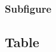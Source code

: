 \documentclass[12pt,a4paper,twoside]{report}
\begin{document}
            \subsubsection{Subfigure}
                \label{sec:subfig}    
                
                
       \clearpage
            
        \subsection{Table}
            \label{sec:tbl}    
            

       \clearpage

    
    
\end{document}
